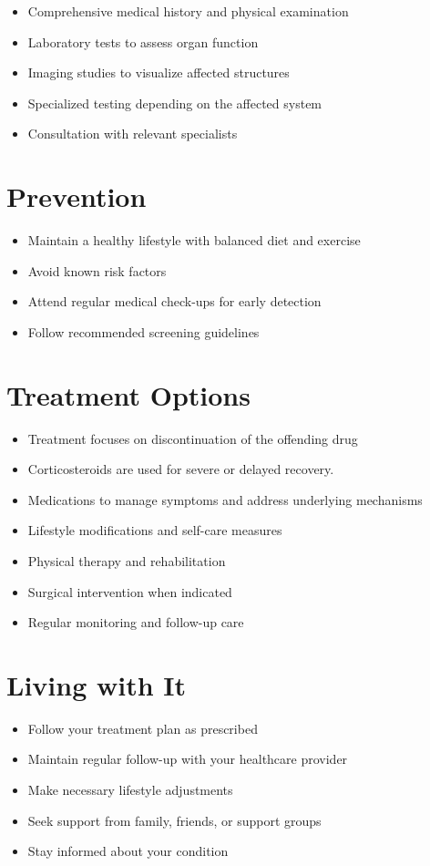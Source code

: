 \begin{itemize}[noitemsep]
  \item Comprehensive medical history and physical examination
  \item Laboratory tests to assess organ function
  \item Imaging studies to visualize affected structures
  \item Specialized testing depending on the affected system
  \item Consultation with relevant specialists
\end{itemize}
\section{Prevention}
\begin{itemize}[noitemsep]
  \item Maintain a healthy lifestyle with balanced diet and exercise
  \item Avoid known risk factors
  \item Attend regular medical check-ups for early detection
  \item Follow recommended screening guidelines
\end{itemize}
\section{Treatment Options}
\begin{itemize}[noitemsep]
  \item Treatment focuses on discontinuation of the offending drug
  \item Corticosteroids are used for severe or delayed recovery.
  \item Medications to manage symptoms and address underlying mechanisms
  \item Lifestyle modifications and self-care measures
  \item Physical therapy and rehabilitation
  \item Surgical intervention when indicated
  \item Regular monitoring and follow-up care
\end{itemize}
\section{Living with It}
\begin{itemize}[noitemsep]
  \item Follow your treatment plan as prescribed
  \item Maintain regular follow-up with your healthcare provider
  \item Make necessary lifestyle adjustments
  \item Seek support from family, friends, or support groups
  \item Stay informed about your condition
\end{itemize}
